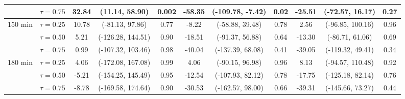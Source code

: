 \begin{table}[ht]
{\begin{tabular}{llccccccccc}
 & $\tau=0.75$ & \textbf{32.84} & \textbf{(11.14, 58.90)} & \textbf{0.002} & \textbf{-58.35} & \textbf{(-109.78, -7.42)} & \textbf{0.02} & -25.51 & (-72.57, 16.17) & 0.27 \\
\midrule
\multirow{3}{*}{150 min} & $\tau=0.25$ & 10.78 & (-81.13, 97.86) & 0.77 & -8.22 & (-58.88, 39.48) & 0.78 & 2.56 & (-96.85, 100.16) & 0.96 \\
 & $\tau=0.50$ & 5.21 & (-126.28, 144.51) & 0.90 & -18.51 & (-91.37, 56.88) & 0.64 & -13.30 & (-86.71, 61.06) & 0.69 \\
 & $\tau=0.75$ & 0.99 & (-107.32, 103.46) & 0.98 & -40.04 & (-137.39, 68.08) & 0.41 & -39.05 & (-119.32, 49.41) & 0.34 \\
\midrule
\multirow{3}{*}{180 min} & $\tau=0.25$ & 4.06 & (-172.08, 167.08) & 0.99 & 4.06 & (-90.15, 96.98) & 0.96 & 8.13 & (-94.57, 110.48) & 0.92 \\
 & $\tau=0.50$ & -5.21 & (-154.25, 145.49) & 0.95 & -12.54 & (-107.93, 82.12) & 0.78 & -17.75 & (-125.18, 82.14) & 0.76 \\
 & $\tau=0.75$ & -8.78 & (-169.58, 174.64) & 0.90 & -30.53 & (-162.57, 98.00) & 0.66 & -39.31 & (-145.66, 73.27) & 0.44 \\
\bottomrule
\end{tabular}%
}
\end{table}
